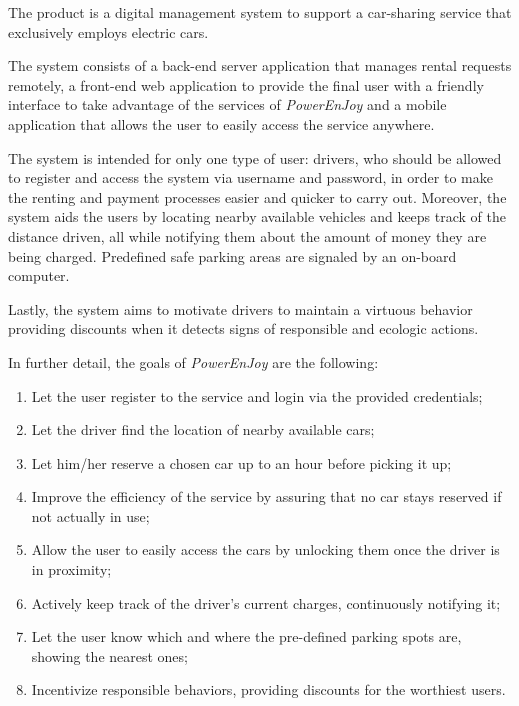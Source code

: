 The product is a digital management system to support a car-sharing service that exclusively employs electric cars.

The system consists of a back-end server application that manages rental requests remotely, a front-end web application to provide the final user with a friendly interface to take advantage of the services of \hbox{\emph{PowerEnJoy}} and a mobile application that allows the user to easily access the service anywhere.

The system is intended for only one type of user: drivers, who should be allowed to register and access the system via username and password, in order to make the renting and payment processes easier and quicker to carry out. Moreover, the system aids the users by locating nearby available vehicles and keeps track of the distance driven, all while notifying them about the amount of money they are being charged. Predefined safe parking areas are signaled by an on-board computer.

Lastly, the system aims to motivate drivers to maintain a virtuous behavior providing discounts when it detects signs of responsible and ecologic actions.

In further detail, the goals of \hbox{\emph{PowerEnJoy}} are the following:

\begin{enumerate}
\item Let the user register to the service and login via the provided credentials;
\item Let the driver find the location of nearby available cars;
\item Let him/her reserve a chosen car up to an hour before picking it up;
\item Improve the efficiency of the service by assuring that no car stays reserved if not actually in use;
\item Allow the user to easily access the cars by unlocking them once the driver is in proximity;
\item Actively keep track of the driver's current charges, continuously notifying it;
\item Let the user know which and where the pre-defined parking spots are, showing the nearest ones;
\item Incentivize responsible behaviors, providing discounts for the worthiest users.
\end{enumerate}